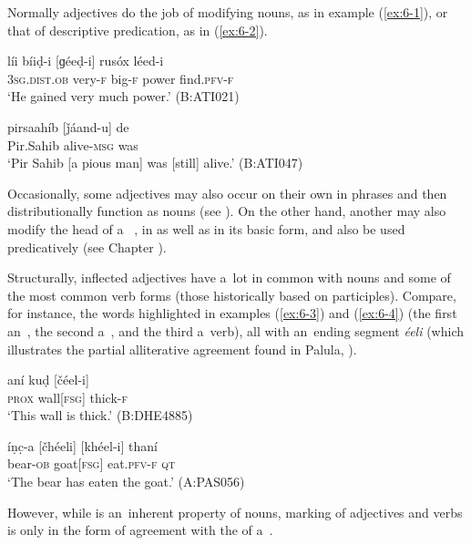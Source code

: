 Normally adjectives do the job of modifying nouns, as in example (\ref{ex:6-1}), or that of descriptive predication, as in (\ref{ex:6-2}).

\begin{exe}
\ex
\label{ex:6-1}
\gll líi bíiḍ-i [ɡéeḍ-i] rusóx léed-i \\
\textsc{3sg.dist.ob} very-\textsc{f} big-\textsc{f} power find.\textsc{pfv-f} \\
\glt `He gained very much power.' (B:ATI021)

\ex
\label{ex:6-2}
\gll pirsaahíb [ǰáand-u] de \\
Pir.Sahib alive-\textsc{msg} was  \\
\glt `Pir Sahib [a pious man] was [still] alive.' (B:ATI047)
\end{exe}

Occasionally, some adjectives may also occur on their own in  phrases and then distributionally function as nouns (see ). On the other hand, another  may also modify the head  of a~ , in  as well as in its basic form, and also be used predicatively (see Chapter ).


Structurally, inflected adjectives have a~lot in common with nouns and some of the most common  verb forms (those historically based on participles). Compare, for instance, the words highlighted in examples (\ref{ex:6-3}) and (\ref{ex:6-4}) (the first an~, the second a~, and the third a~verb), all with an~ending segment \textit{éeli} (which illustrates the partial alliterative agreement found in Palula, \citealt[87--88]{corbett2006}).

\begin{exe}
\ex
\label{ex:6-3}
\gll aní kuḍ [čéel-i] \\
\textsc{prox} wall[\textsc{fsg}] thick-\textsc{f} \\
\glt `This wall is thick.' (B:DHE4885)

\ex
\label{ex:6-4}
\gll íṇc̣-a [čhéeli] [khéel-i] thaní \\
bear-\textsc{ob} goat[\textsc{fsg}] eat.\textsc{pfv-f} \textsc{qt} \\
\glt `The bear has eaten the goat.' (A:PAS056)
\end{exe}

However, while  is an~inherent property of nouns,  marking of adjectives and verbs is only in the form of agreement with the  of a~. 



